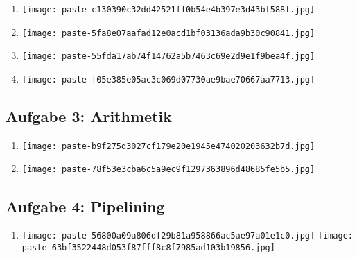 \documentclass[12pt,a4paper]{article}
\begin{document}
\begin{enumerate}[label=\alph*), topsep=5pt, itemsep=10pt]
\item \mbox{}\begin{center}\texttt{[image: paste-c130390c32dd42521ff0b54e4b397e3d43bf588f.jpg]}
\end{center}
\item \mbox{}\begin{center}\texttt{[image: paste-5fa8e07aafad12e0acd1bf03136ada9b30c90841.jpg]}
\end{center}
\item \mbox{}\begin{center}\texttt{[image: paste-55fda17ab74f14762a5b7463c69e2d9e1f9bea4f.jpg]}
\end{center}
\item \mbox{}\begin{center}\texttt{[image: paste-f05e385e05ac3c069d07730ae9bae70667aa7713.jpg]}
\end{center}
\end{enumerate}
\clearpage
\subsection*{Aufgabe 3: Arithmetik}

\begin{enumerate}[label=\alph*), topsep=5pt, itemsep=10pt]
\item \mbox{}\begin{center}\texttt{[image: paste-b9f275d3027cf179e20e1945e474020203632b7d.jpg]}
\end{center}
\item \mbox{}\begin{center}\texttt{[image: paste-78f53e3cba6c5a9ec9f1297363896d48685fe5b5.jpg]}
\end{center}
\end{enumerate}
\clearpage
\subsection*{Aufgabe 4: Pipelining}

\begin{enumerate}[label=\alph*), topsep=5pt, itemsep=10pt]
\item \mbox{}\begin{center}\texttt{[image: paste-56800a09a806df29b81a958866ac5ae97a01e1c0.jpg]}
\texttt{[image: paste-63bf3522448d053f87fff8c8f7985ad103b19856.jpg]}
\end{center}
\end{enumerate}
\clearpage
\end{document}
